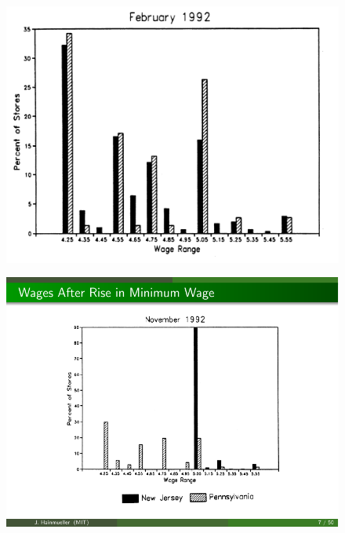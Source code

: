 \documentclass[notes=show]{beamer}
\begin{document}
\begin{frame}[plain]
	\begin{figure}
	\includegraphics[scale=0.25]{./lecture_includes/ck.png}
	\end{figure}
\end{frame}


\begin{frame}[plain]
	\begin{figure}
	\includegraphics{./lecture_includes/ck_fig2.pdf}
	\end{figure}
\end{frame}
\end{document}
